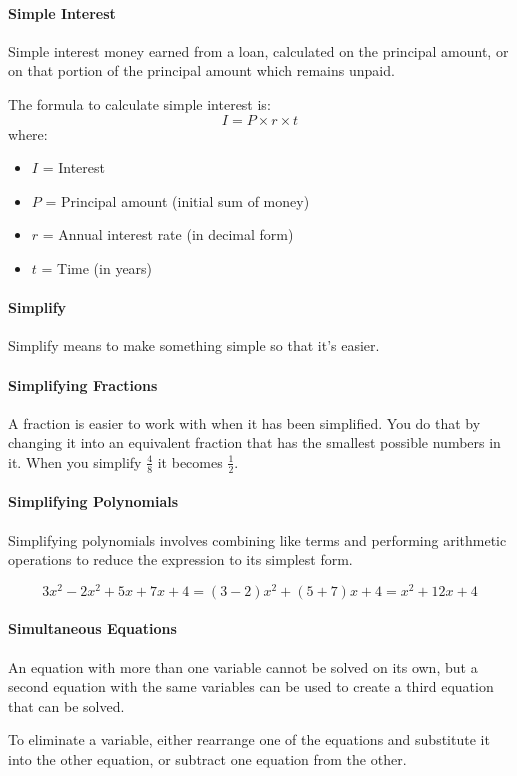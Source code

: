 \documentclass[12pt]{article}
\begin{document}
\paragraph{Simple Interest}
Simple interest money earned from a loan, calculated on the principal amount, or on that portion of the principal amount which remains unpaid.

The formula to calculate simple interest is:
\[
I = P \times r \times t
\]
where:
\begin{itemize}
    \item \(I\) = Interest
    \item \(P\) = Principal amount (initial sum of money)
    \item \(r\) = Annual interest rate (in decimal form)
    \item \(t\) = Time (in years)
\end{itemize}

\paragraph{Simplify} Simplify means to make something simple so that it's easier.

\paragraph{Simplifying Fractions}
A fraction is easier to work with when it has been simplified. You do that by changing it into an equivalent fraction that has the smallest possible numbers in it. When you simplify $\frac{4}{8}$ it becomes $\frac{1}{2}$.

\paragraph{Simplifying Polynomials}
Simplifying polynomials involves combining like terms and performing arithmetic operations to reduce the expression to its simplest form.

\[3x^2 - 2x^2 + 5x + 7x + 4 = (3 - 2)x^2 + (5 + 7)x + 4 = x^2 + 12x + 4\]

\paragraph{Simultaneous Equations}
An equation with more than one variable cannot be solved on its own, but a second equation with the same variables can be used to create a third equation that can be solved.

To eliminate a variable, either rearrange one of the equations and substitute it into the other equation, or subtract one equation from the other.
\end{document}
